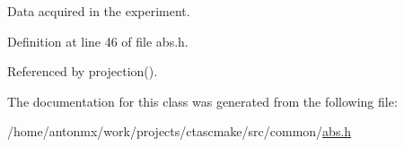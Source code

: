 Data acquired in the experiment. 



Definition at line 46 of file abs.h.



Referenced by projection().



The documentation for this class was generated from the following file:\begin{DoxyCompactItemize}
\item 
/home/antonmx/work/projects/ctascmake/src/common/\hyperlink{abs_8h}{abs.h}\end{DoxyCompactItemize}
